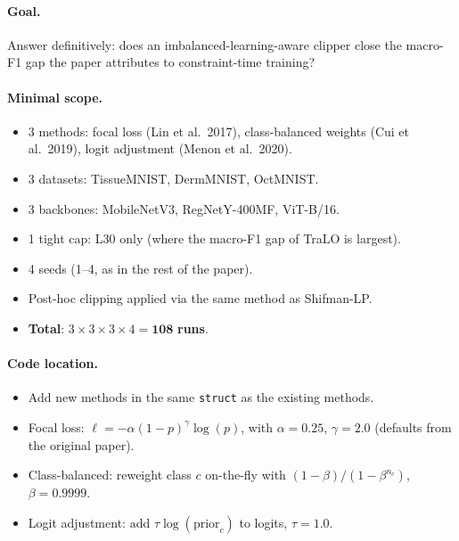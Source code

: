 \documentclass[11pt,a4paper]{article}
\newcommand{\code}[1]{\texttt{#1}}
\begin{document}
\paragraph{Goal.} Answer definitively: does an imbalanced-learning-aware
clipper close the macro-F1 gap the paper attributes to constraint-time
training?

\paragraph{Minimal scope.}
\begin{itemize}[nosep]
  \item 3 methods: focal loss (Lin et al.\ 2017), class-balanced weights
        (Cui et al.\ 2019), logit adjustment (Menon et al.\ 2020).
  \item 3 datasets: TissueMNIST, DermMNIST, OctMNIST.
  \item 3 backbones: MobileNetV3, RegNetY-400MF, ViT-B/16.
  \item 1 tight cap: L30 only (where the macro-F1 gap of TraLO is largest).
  \item 4 seeds (1--4, as in the rest of the paper).
  \item Post-hoc clipping applied via the same method as Shifman-LP.
  \item \textbf{Total}: $3 \times 3 \times 3 \times 4 = \mathbf{108}$
        \textbf{runs}.
\end{itemize}

\paragraph{Code location.}
\begin{itemize}[nosep]
  \item Add new methods in the same \code{struct} as the existing methods.
  \item Focal loss: $\ell = -\alpha (1-p)^\gamma \log(p)$, with
        $\alpha{=}0.25$, $\gamma{=}2.0$ (defaults from the original paper).
  \item Class-balanced: reweight class $c$ on-the-fly with
        $(1-\beta)/(1-\beta^{n_c})$, $\beta{=}0.9999$.
  \item Logit adjustment: add $\tau \log(\text{prior}_c)$ to logits,
        $\tau{=}1.0$.
\end{itemize}
\end{document}

